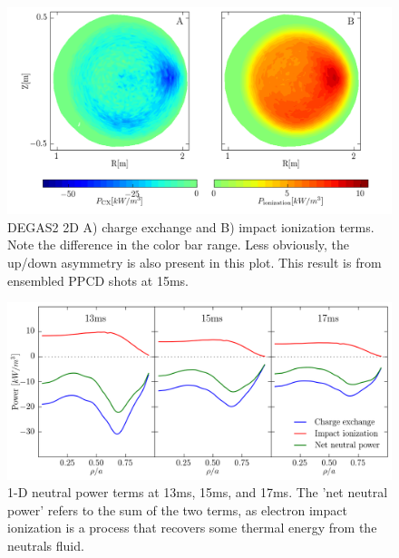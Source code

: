 \begin{figure}
    \centering
    \includegraphics[width=\linewidth]{ion_transport_results/DEGAS2_power_terms_2d.png}
    \caption[DEGAS2 charge exchange and impact ionization terms]{DEGAS2 2D  A) charge exchange and B) impact ionization terms. Note the difference in the color bar range. Less obviously, the up/down asymmetry is also present in this plot. This result is from ensembled PPCD shots at 15ms.}
    \label{fig:DEGAS2_power_2d}
\end{figure}

\begin{figure}
    \centering
    \includegraphics{ion_transport_results/DEGAS2_power_terms_1d.png}
    \caption[1-D neutral power terms]{1-D neutral power terms at 13ms, 15ms, and 17ms. The 'net neutral power' refers to the sum of the two terms, as electron impact ionization is a process that recovers some thermal energy from the neutrals fluid.}
    \label{fig:DEGAS2_power_1d}
\end{figure}


